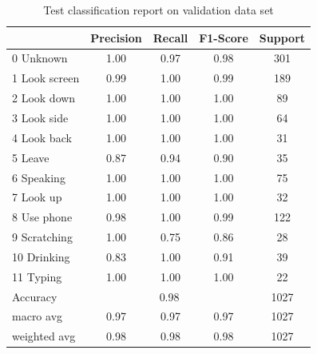 \begin{table}[!htbp]
\centering
\begin{tabular}{|l|c|c|c|c|}
\hline
              & Precision & Recall & F1-Score & Support \\ \hline
0 Unknown     & 1.00      & 0.97   & 0.98     & 301     \\ \hline
1 Look screen & 0.99      & 1.00   & 0.99     & 189     \\ \hline
2 Look down   & 1.00      & 1.00   & 1.00     & 89      \\ \hline
3 Look side   & 1.00      & 1.00   & 1.00     & 64      \\ \hline
4 Look back   & 1.00      & 1.00   & 1.00     & 31      \\ \hline
5 Leave       & 0.87      & 0.94   & 0.90     & 35      \\ \hline
6 Speaking    & 1.00      & 1.00   & 1.00     & 75      \\ \hline
7 Look up     & 1.00      & 1.00   & 1.00     & 32      \\ \hline
8 Use phone   & 0.98      & 1.00   & 0.99     & 122     \\ \hline
9 Scratching  & 1.00      & 0.75   & 0.86     & 28      \\ \hline
10 Drinking   & 0.83      & 1.00   & 0.91     & 39      \\ \hline
11 Typing     & 1.00      & 1.00   & 1.00     & 22      \\ \hline
Accuracy      & \multicolumn{3}{c|}{0.98}     & 1027    \\ \hline
macro avg     & 0.97      & 0.97   & 0.97     & 1027    \\ \hline
weighted avg  & 0.98      & 0.98   & 0.98     & 1027    \\ \hline
\end{tabular}
\caption{Test classification report on validation data set}
\label{tab:Test classification report}
\end{table}
